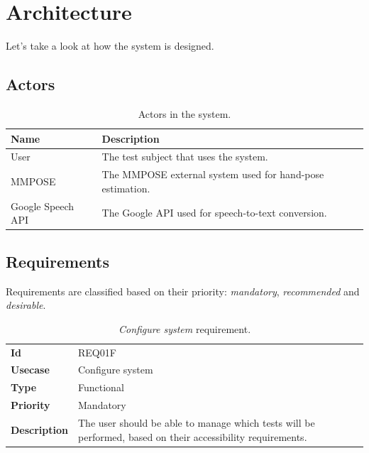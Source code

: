 \section{Architecture}
Let's take a look at how the system is designed.

\subsection{Actors}
\begin{table}[h!t]
    \caption{Actors in the system.}
    \label{tab:actors}
    \centering
    \begin{tabular}{l p{70mm}}
        \textbf{Name}     & \textbf{Description}                                      \\
        \hline
        User              & The test subject that uses the system.                    \\
        MMPOSE            & The MMPOSE external system used for hand-pose estimation. \\
        Google Speech API & The Google API used for speech-to-text conversion.
    \end{tabular}
\end{table}

\subsection{Requirements} \label{sec:architecture:requirements}
Requirements are classified based on their priority: \emph{mandatory}, \emph{recommended} and \emph{desirable}.

\begin{table}[h!t]
    \centering
    \caption{\emph{Configure system} requirement.}
    \label{tab:req:configure}
    \centering
    \begin{tabular}{l | p{80mm}}
        \textbf{Id}          & REQ01F                                                                                                      \\
        \textbf{Usecase}     & Configure system                                                                                            \\
        \textbf{Type}        & Functional                                                                                                  \\
        \textbf{Priority}    & Mandatory                                                                                                   \\
        \textbf{Description} & The user should be able to manage which tests will be performed, based on their accessibility requirements.
    \end{tabular}
\end{table}

